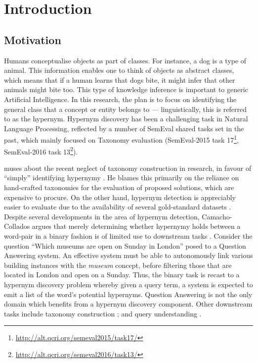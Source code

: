 \chapter{Introduction}

\section{Motivation}
Humans conceptualise objects as part of classes.  For instance, a dog is a type of animal. This information
enables one to think of objects as abstract classes, which means that if a human learns that dogs bite, it might infer that other animals might bite too.  This type of knowledge inference is important to generic Artificial Intelligence. In this research, the plan is to focus on identifying the general class that a concept or entity belongs to — linguistically, this is referred
to as the hypernym.  Hypernym discovery has been a challenging task in Natural Language Processing, reflected by a number of SemEval shared tasks set in the past, which mainly focused on Taxonomy evaluation (SemEval-2015 task 17\footnote{\url{http://alt.qcri.org/semeval2015/task17/}}, SemEval-2016 task 13\footnote{\url{http://alt.qcri.org/semeval2016/task13/}}).  

\citeauthor{camacho2017we} muses about the recent neglect of taxonomy construction in research, in favour of “simply” identifying hypernymy \citep{camacho2017we}.  He blames this primarily on the reliance on hand-crafted taxonomies for the evaluation of proposed solutions, which are expensive to procure.  On the other hand, hypernym detection is appreciably easier to evaluate due to the availability of several gold-standard datasets \citep{Baroni2011, santus2015evalution, weeds2014learning}.  Despite several developments in the area of hypernym detection, Camacho-Collados argues that merely determining whether hypernymy holds between a word-pair in a binary fashion is of limited use to downstream tasks \citep{camacho2017we}.  Consider the question “Which museums are open on Sunday in London” posed to a Question Answering system.  An effective system must be able to autonomously link various building instances with the \textit{museum} concept, before filtering those that are located in London and open on a Sunday.  Thus, the binary task is recast to a hypernym discovery problem whereby given a query term, a system is expected to emit a list of the word’s potential hypernyms.  Question Answering is not the only domain which benefits from a hypernym discovery component.  Other downstream tasks include taxonomy construction \citep{wu2012probase}; and query understanding \citep{hua2017understand}.

